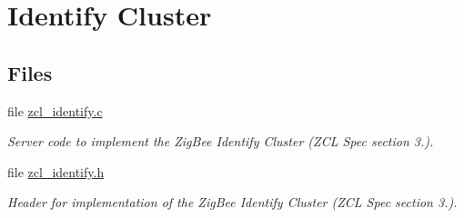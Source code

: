 \hypertarget{group__zcl__identify}{}\section{Identify Cluster}
\label{group__zcl__identify}
\subsection*{Files}
\begin{DoxyCompactItemize}
\item 
file \hyperlink{zcl__identify_8c}{zcl\+\_\+identify.\+c}
\begin{DoxyCompactList}\small\item\em Server code to implement the Zig\+Bee Identify Cluster (Z\+CL Spec section 3.). \end{DoxyCompactList}\item 
file \hyperlink{zcl__identify_8h}{zcl\+\_\+identify.\+h}
\begin{DoxyCompactList}\small\item\em Header for implementation of the Zig\+Bee Identify Cluster (Z\+CL Spec section 3.). \end{DoxyCompactList}\end{DoxyCompactItemize}

